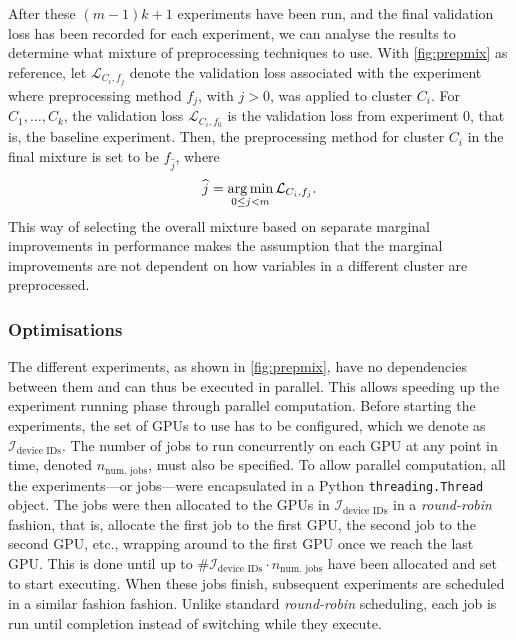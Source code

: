 \documentclass{statsmsc}
\begin{document}
{After these $(m-1)k+1$ experiments have been run, and the final validation loss has been recorded
for each experiment, we can analyse the results to determine what mixture of preprocessing
techniques to use. With \cref{fig:prepmix} as reference, let $\mathcal{L}_{C_{i},f_j}$
denote the validation loss associated with the experiment where
preprocessing method $f_j$, with $j>0$, was applied to cluster $C_i$.
For $C_1,\dots,C_k$, the validation loss
$\mathcal{L}_{C_i,f_0}$ is the validation loss from experiment 0, that is, the baseline experiment.
Then, the preprocessing method for cluster $C_i$ in the final mixture
is set to be $f_{\widehat{j}}$, where
\begin{equation}
    \widehat{j}=\operatorname*{arg\,min}_{0 \leq j < m}  \mathcal{L}_{C_i,f_j}.
\end{equation}
This way of selecting the overall mixture based on separate marginal improvements in performance
makes the assumption
that the marginal improvements are not dependent on how variables in a different cluster are
preprocessed.

\subsubsection{Optimisations}%
\label{ssub:Optimisations}

The different experiments, as shown in \cref{fig:prepmix}, have no dependencies
between them and can thus be executed in parallel. This allows speeding up the
experiment running phase through parallel computation.
Before starting the experiments, the set of \acp{GPU}
to use has to be configured, which we denote as $\mathcal{I}_{\textrm{device IDs}}$.
The number of jobs
to run concurrently on each \ac{GPU} at any point in time, denoted $n_{\textrm{num. jobs}}$, must
also be specified.
To allow parallel computation, all the experiments---or jobs---were encapsulated in a Python
\texttt{threading.Thread} object. The jobs were then allocated to the \acp{GPU} in
$\mathcal{I}_{\textrm{device IDs}}$ in a \textit{round-robin} fashion, that is, allocate the first
job to the first \ac{GPU}, the second job to the second \ac{GPU}, etc., wrapping around to the first
\ac{GPU} once we reach the last \ac{GPU}. This is done until up to
$\# \mathcal{I}_{\textrm{device IDs}} \cdot n_{\textrm{num. jobs}}$ have been allocated and
set to start executing.
When these jobs finish, subsequent experiments are scheduled in a similar fashion
fashion. Unlike standard \textit{round-robin} scheduling, each job is run until completion instead
of switching while they execute.

}
\end{document}
